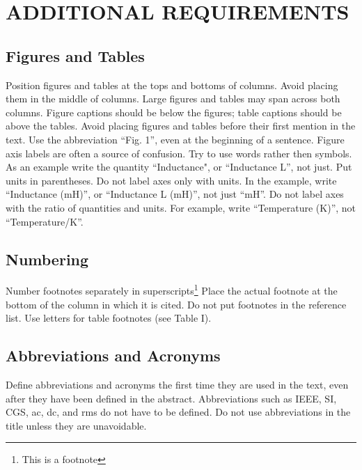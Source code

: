 \documentclass[letterpaper, 10 pt, conference]{ieeeconf}  %
\begin{document}
\section{ADDITIONAL REQUIREMENTS}

\subsection{Figures and Tables}

Position figures and tables at the tops and bottoms of columns.
Avoid placing them in the middle of columns. Large figures and tables
may span across both columns. Figure captions should be below the figures;
 table captions should be above the tables. Avoid placing figures and tables
  before their first mention in the text. Use the abbreviation ``Fig. 1'',
  even at the beginning of a sentence.
Figure axis labels are often a source of confusion.
Try to use words rather then symbols. As an example write the quantity ``Inductance",
 or ``Inductance L'', not just.
 Put units in parentheses. Do not label axes only with units.
 In the example, write ``Inductance (mH)'', or ``Inductance L (mH)'', not just ``mH''.
 Do not label axes with the ratio of quantities and units.
 For example, write ``Temperature (K)'', not ``Temperature/K''.

\subsection{Numbering}

Number footnotes separately in superscripts\footnote{This is a footnote}
Place the actual footnote at the bottom of the column in which it is cited.
Do not put footnotes in the reference list.
Use letters for table footnotes (see Table I).

\subsection{Abbreviations and Acronyms}

Define abbreviations and acronyms the first time they are used in the text,
even after they have been defined in the abstract. Abbreviations such as
IEEE, SI, CGS, ac, dc, and rms do not have to be defined. Do not use
abbreviations in the title unless they are unavoidable.
\end{document}
